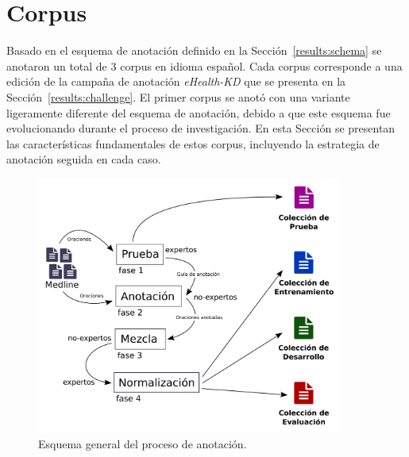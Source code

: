 \section{Corpus}\label{results:corpus}

Basado en el esquema de anotación definido en la Sección~\ref{results:schema} se anotaron un total de 3 corpus en idioma español.
Cada corpus corresponde a una edición de la campaña de anotación \textit{eHealth-KD} que se presenta en la Sección~\ref{results:challenge}. El primer corpus se anotó con una variante ligeramente diferente del esquema de anotación, debido a que este esquema fue evolucionando durante el proceso de investigación.
En esta Sección se presentan las características fundamentales de estos corpus, incluyendo la estrategia
de anotación seguida en cada caso.

\begin{figure}[htb]
    \centering
    \includegraphics[width=0.9\textwidth]{Images/Chapters/AnnotationProcess.pdf}
    \caption{Esquema general del proceso de anotación.}
    \label{fig:annotation-process}
\end{figure}

